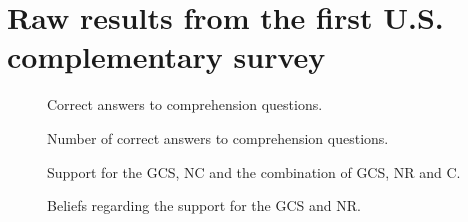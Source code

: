 \clearpage
\section{Raw results from the first U.S. complementary survey}

\begin{figure}[h!]
    \caption{Correct answers to comprehension questions.}\label{fig:understood_each}
\end{figure}

\begin{figure}[h!]
    \caption{Number of correct answers to comprehension questions.}\label{fig:understood_score}
\end{figure}

\begin{figure}[h!]
    \caption{Support for the GCS, NC and the combination of GCS, NR and C.}\label{fig:support_binary}
\end{figure}

\begin{figure}[h!]
    \caption{Beliefs regarding the support for the GCS and NR.}\label{fig:belief}
\end{figure}

